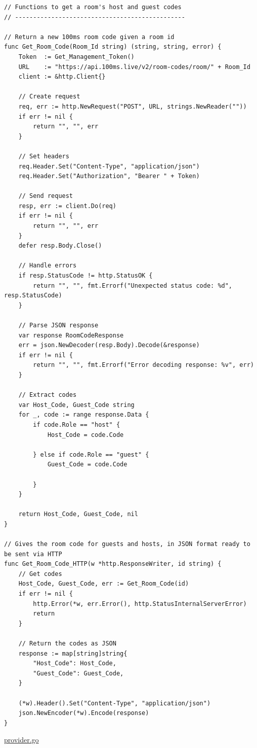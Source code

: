 \begin{verbatim}
// Functions to get a room's host and guest codes
// -----------------------------------------------

// Return a new 100ms room code given a room id
func Get_Room_Code(Room_Id string) (string, string, error) {
	Token  := Get_Management_Token()
	URL    := "https://api.100ms.live/v2/room-codes/room/" + Room_Id
	client := &http.Client{}

	// Create request
	req, err := http.NewRequest("POST", URL, strings.NewReader(""))
	if err != nil {
		return "", "", err
	}

	// Set headers
	req.Header.Set("Content-Type", "application/json")
	req.Header.Set("Authorization", "Bearer " + Token)

	// Send request
	resp, err := client.Do(req)
	if err != nil {
		return "", "", err
	}
	defer resp.Body.Close()

	// Handle errors
    if resp.StatusCode != http.StatusOK {
        return "", "", fmt.Errorf("Unexpected status code: %d", resp.StatusCode)
    }

    // Parse JSON response
	var response RoomCodeResponse
	err = json.NewDecoder(resp.Body).Decode(&response)
    if err != nil {
        return "", "", fmt.Errorf("Error decoding response: %v", err)
    }

    // Extract codes
    var Host_Code, Guest_Code string
    for _, code := range response.Data {
        if code.Role == "host" {
            Host_Code = code.Code

        } else if code.Role == "guest" {
            Guest_Code = code.Code

        }
    }

    return Host_Code, Guest_Code, nil
}

// Gives the room code for guests and hosts, in JSON format ready to be sent via HTTP
func Get_Room_Code_HTTP(w *http.ResponseWriter, id string) {
    // Get codes
	Host_Code, Guest_Code, err := Get_Room_Code(id)
    if err != nil {
        http.Error(*w, err.Error(), http.StatusInternalServerError)
        return
    }

    // Return the codes as JSON
    response := map[string]string{
        "Host_Code": Host_Code,
        "Guest_Code": Guest_Code,
    }

    (*w).Header().Set("Content-Type", "application/json")
    json.NewEncoder(*w).Encode(response)
}
\end{verbatim}

\underline{provider.go}

